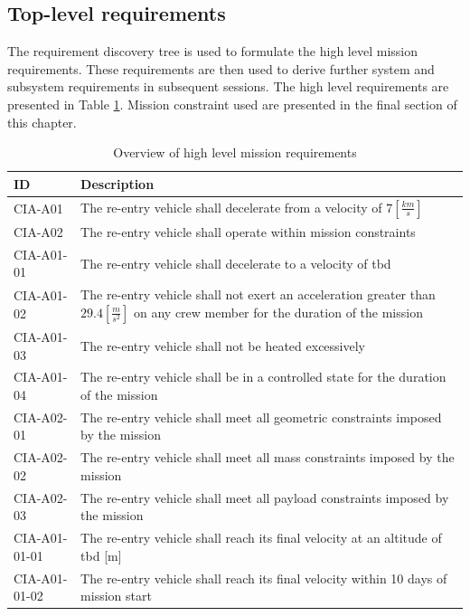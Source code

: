 \subsection{Top-level requirements}
The requirement discovery tree is used to formulate the high level mission requirements. These requirements are then used to derive further system and subsystem requirements in subsequent sessions. The high level requirements are presented in Table \ref{tab:toplevelreq}. Mission constraint used are presented in the final section of this chapter.

\begin{table}[H]
	\caption{Overview of high level mission requirements} \label{tab:toplevelreq}
	\begin{tabular}{|p{}|p{}|}
    \hline
    ID          & Description                                                                                                      \\ \hline \hline
    CIA-A01 & The re-entry vehicle shall decelerate from a velocity of $7 [\frac{km}{s}]$ \\ \hline
    CIA-A02 & The re-entry vehicle shall operate within mission constraints                                               \\ \hline
    CIA-A01-01 & The re-entry vehicle shall decelerate to a velocity of \gls{tbd}     \\ \hline
    CIA-A01-02 & The re-entry vehicle shall not exert an acceleration greater than $29.4 [\frac{m}{s^2}]$ on any crew member for the duration of the mission			\\ \hline
    CIA-A01-03 & The re-entry vehicle shall not be heated excessively  \\ \hline
    CIA-A01-04 & The re-entry vehicle shall be in a controlled state for the duration of the mission                            \\ \hline
    CIA-A02-01 & The re-entry vehicle shall meet all geometric constraints imposed by the mission                           \\ \hline
    CIA-A02-02 & The re-entry vehicle shall meet all mass constraints imposed by the mission                                      \\ \hline
	CIA-A02-03 & The re-entry vehicle shall meet all payload constraints imposed by the mission \\ \hline
	CIA-A01-01-01 & The re-entry vehicle shall reach its final velocity at an altitude of \gls{tbd} [m] \\ \hline
	CIA-A01-01-02 & The re-entry vehicle shall reach its final velocity within 10 days of mission start \\ \hline
    \end{tabular}
\end{table}










